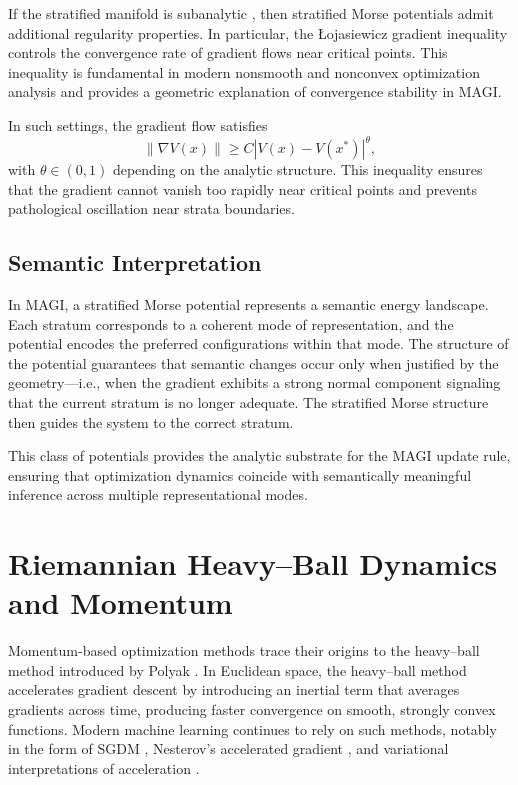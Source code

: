 \documentclass[12pt]{article}
\begin{document}
If the stratified manifold is subanalytic \citep{BierstoneMilman1988,Lojasiewicz1965}, then stratified Morse potentials admit additional regularity properties. In particular, the Łojasiewicz gradient inequality \citep{HarauxJendoubi2012,Kurdyka1998} controls the convergence rate of gradient flows near critical points. This inequality is fundamental in modern nonsmooth and nonconvex optimization analysis \citep{Bolte2014} and provides a geometric explanation of convergence stability in MAGI.

In such settings, the gradient flow satisfies
\[
\|\nabla V(x)\| \ge C |V(x) - V(x^\ast)|^\theta,
\]
with $\theta \in (0,1)$ depending on the analytic structure. This inequality ensures that the gradient cannot vanish too rapidly near critical points and prevents pathological oscillation near strata boundaries.

\subsection*{Semantic Interpretation}

In MAGI, a stratified Morse potential represents a semantic energy landscape. Each stratum corresponds to a coherent mode of representation, and the potential encodes the preferred configurations within that mode. The structure of the potential guarantees that semantic changes occur only when justified by the geometry—i.e., when the gradient exhibits a strong normal component signaling that the current stratum is no longer adequate. The stratified Morse structure then guides the system to the correct stratum.

This class of potentials provides the analytic substrate for the MAGI update rule, ensuring that optimization dynamics coincide with semantically meaningful inference across multiple representational modes.
\section{Riemannian Heavy–Ball Dynamics and Momentum}

Momentum-based optimization methods trace their origins to the heavy–ball method introduced by Polyak \citep{Polyak1964}. In Euclidean space, the heavy–ball method accelerates gradient descent by introducing an inertial term that averages gradients across time, producing faster convergence on smooth, strongly convex functions. Modern machine learning continues to rely on such methods, notably in the form of SGDM \citep{Sutskever2013}, Nesterov’s accelerated gradient \citep{Nesterov1983}, and variational interpretations of acceleration \citep{Wibisono2016}.
\end{document}
